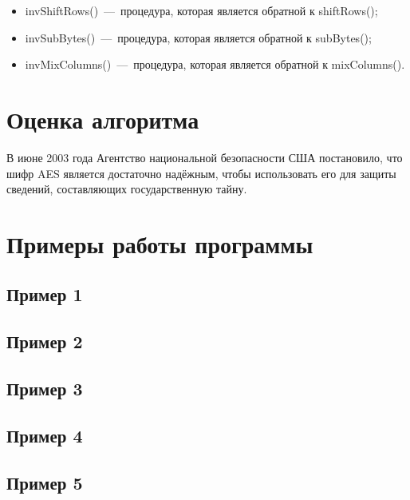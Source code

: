 \documentclass[utf8x, 14pt, bold, times]{G7-32} %
\begin{document}
\begin{itemize}
\item invShiftRows()~---~процедура, которая является обратной к shiftRows();
\item invSubBytes()~---~процедура, которая является обратной к subBytes();
\item invMixColumns()~---~процедура, которая является обратной к mixColumns(). 
\end{itemize}

\chapter{Оценка алгоритма}

В июне 2003 года Агентство национальной безопасности США постановило, что шифр AES
является достаточно надёжным, чтобы использовать его для защиты сведений, составляющих
государственную тайну.

\chapter{Примеры работы программы}

\section{Пример 1}



\section{Пример 2}



\section{Пример 3}



\section{Пример 4}



\section{Пример 5}


\end{document}
